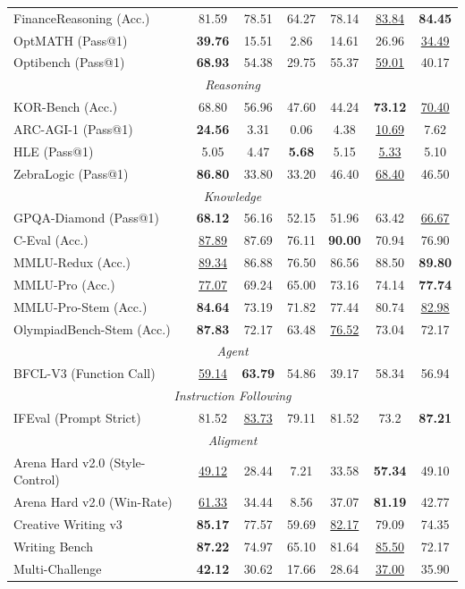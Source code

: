 \begin{table}[t]
{\begin{tabular}{lcccccc}
 FinanceReasoning (Acc.) & 81.59 & 78.51 & 64.27 & 78.14 & \underline{83.84} & \textbf{84.45} \\
 OptMATH (Pass@1) & \textbf{39.76} & 15.51 & 2.86 & 14.61 & 26.96 & \underline{34.49} \\
 Optibench (Pass@1) & \textbf{68.93} & 54.38 & 29.75 & 55.37 & \underline{59.01} & 40.17 \\
\midrule \multicolumn{7}{c}{\textit{Reasoning}} \\
\midrule KOR-Bench (Acc.) & 68.80 & 56.96 & 47.60 & 44.24 & \textbf{73.12} & \underline{70.40} \\
 ARC-AGI-1 (Pass@1) & \textbf{24.56} & 3.31 & 0.06 & 4.38 & \underline{10.69} & 7.62 \\
 HLE (Pass@1) & 5.05 & 4.47 & \textbf{5.68} & 5.15 & \underline{5.33} & 5.10 \\
 ZebraLogic (Pass@1) & \textbf{86.80} & 33.80 & 33.20 & 46.40 & \underline{68.40} & 46.50 \\
\midrule \multicolumn{7}{c}{\textit{Knowledge}} \\
\midrule GPQA-Diamond (Pass@1) & \textbf{68.12} & 56.16 & 52.15 & 51.96 & 63.42 & \underline{66.67} \\
 C-Eval (Acc.) & \underline{87.89} & 87.69 & 76.11 & \textbf{90.00} & 70.94 & 76.90 \\
 MMLU-Redux (Acc.) & \underline{89.34} & 86.88 & 76.50 & 86.56 & 88.50 & \textbf{89.80} \\
 MMLU-Pro (Acc.) & \underline{77.07} & 69.24 & 65.00 & 73.16 & 74.14 & \textbf{77.74} \\
 MMLU-Pro-Stem (Acc.) & \textbf{84.64} & 73.19 & 71.82 & 77.44 & 80.74 & \underline{82.98} \\
 OlympiadBench-Stem (Acc.) & \textbf{87.83} & 72.17 & 63.48 & \underline{76.52} & 73.04 & 72.17 \\
\midrule \multicolumn{7}{c}{\textit{Agent}} \\
\midrule BFCL-V3 (Function Call) & \underline{59.14} & \textbf{63.79} & 54.86 & 39.17 & 58.34 & 56.94 \\
\midrule \multicolumn{7}{c}{\textit{Instruction Following}} \\
\midrule IFEval (Prompt Strict) & 81.52 & \underline{83.73} & 79.11 & 81.52 & 73.2 & \textbf{87.21} \\
\midrule \multicolumn{7}{c}{\textit{Aligment}} \\
\midrule Arena Hard v2.0 (Style-Control) & \underline{49.12} & 28.44 & 7.21 & 33.58 & \textbf{57.34} & 49.10 \\
 Arena Hard v2.0 (Win-Rate) & \underline{61.33} & 34.44 & 8.56 & 37.07 & \textbf{81.19} & 42.77 \\
 Creative Writing v3 & \textbf{85.17} & 77.57 & 59.69 & \underline{82.17} & 79.09 & 74.35 \\
 Writing Bench & \textbf{87.22} & 74.97 & 65.10 & 81.64 & \underline{85.50} & 72.17 \\
Multi-Challenge & \textbf{42.12} & 30.62 & 17.66 & 28.64 & \underline{37.00} & 35.90 \\
\hline
\end{tabular}
}
\end{table}



